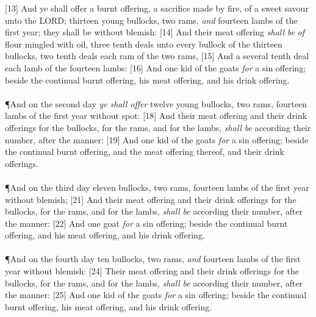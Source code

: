 [13] \textcolor[cmyk]{0.99998,1,0,0}{And ye shall offer a burnt offering, a sacrifice made by fire, of a sweet savour unto the LORD; thirteen young bullocks, two rams, \emph{and} fourteen lambs of the first year; they shall be without blemish:} 
[14] \textcolor[cmyk]{0.99998,1,0,0}{And their meat offering \emph{shall} \emph{be} \emph{of} flour mingled with oil, three tenth deals unto every bullock of the thirteen bullocks, two tenth deals  each ram of the two rams,}
[15] \textcolor[cmyk]{0.99998,1,0,0}{And a several tenth deal  each lamb of the fourteen lambs:}
[16] \textcolor[cmyk]{0.99998,1,0,0}{And one kid of the goats \emph{for} a sin offering; beside the continual burnt offering, his meat offering, and his drink offering.}\\
\\
\P \textcolor[cmyk]{0.99998,1,0,0}{And on the second day \emph{ye} \emph{shall} \emph{offer} twelve young bullocks, two rams, fourteen lambs of the first year without spot:}
[18] \textcolor[cmyk]{0.99998,1,0,0}{And their meat offering and their drink offerings for the bullocks, for the rams, and for the lambs, \emph{shall} \emph{be} according  their number, after the manner:}
[19] \textcolor[cmyk]{0.99998,1,0,0}{And one kid of the goats \emph{for} a sin offering; beside the continual burnt offering, and the meat offering thereof, and their drink offerings.}\\
\\
\P \textcolor[cmyk]{0.99998,1,0,0}{And on the third day eleven bullocks, two rams, fourteen lambs of the first year without blemish;}
[21] \textcolor[cmyk]{0.99998,1,0,0}{And their meat offering and their drink offerings for the bullocks, for the rams, and for the lambs, \emph{shall} \emph{be} according  their number, after the manner:}
[22] \textcolor[cmyk]{0.99998,1,0,0}{And one goat \emph{for} a sin offering; beside the continual burnt offering, and his meat offering, and his drink offering.}\\
\\
\P \textcolor[cmyk]{0.99998,1,0,0}{And on the fourth day ten bullocks, two rams, \emph{and} fourteen lambs of the first year without blemish:}
[24] \textcolor[cmyk]{0.99998,1,0,0}{Their meat offering and their drink offerings for the bullocks, for the rams, and for the lambs, \emph{shall} \emph{be} according  their number, after the manner:}
[25] \textcolor[cmyk]{0.99998,1,0,0}{And one kid of the goats \emph{for} a sin offering; beside the continual burnt offering, his meat offering, and his drink offering.}\\
